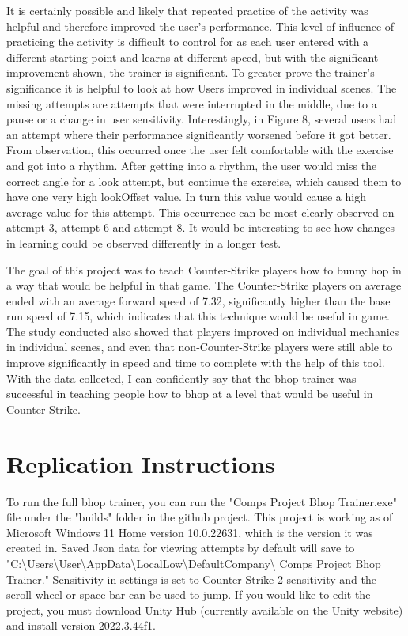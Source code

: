\documentclass[10pt,twocolumn]{article}
\begin{document}
It is certainly possible and likely that repeated practice of the activity was helpful and therefore improved the user's performance. This level of influence of practicing the activity is difficult to control for as each user entered with a different starting point and learns at different speed, but with the significant improvement shown, the trainer is significant. To greater prove the trainer's significance it is helpful to look at how Users improved in individual scenes. The missing attempts are attempts that were interrupted in the middle, due to a pause or a change in user sensitivity.  Interestingly, in Figure 8, several users had an attempt where their performance significantly worsened before it got better. From observation, this occurred once the user felt comfortable with the exercise and got into a rhythm. After getting into a rhythm, the user would miss the correct angle for a look attempt, but continue the exercise, which caused them to have one very high lookOffset value. In turn this value would cause a high average value for this attempt. This occurrence can be most clearly observed on attempt 3, attempt 6 and attempt 8. It would be interesting to see how changes in learning could be observed differently in a longer test.

The goal of this project was to teach Counter-Strike players how to bunny hop in a way that would be helpful in that game. The Counter-Strike players on average ended with an average forward speed of 7.32, significantly higher than the base run speed of 7.15, which indicates that this technique would be useful in game. The study conducted also showed that players improved on individual mechanics in individual scenes, and even that non-Counter-Strike players were still able to improve significantly in speed and time to complete with the help of this tool. With the data collected, I can confidently say that the bhop trainer was successful in teaching people how to bhop at a level that would be useful in Counter-Strike.
    

\printbibliography

\appendix
\section{Replication Instructions}
To run the full bhop trainer, you can run the "Comps Project Bhop Trainer.exe" file under the "builds" folder in the github project. This project is working as of Microsoft Windows 11 Home version 10.0.22631, which is the version it was created in. Saved Json data for viewing attempts by default will save to "C:\textbackslash{}Users\textbackslash{}User\textbackslash{}AppData\textbackslash{}LocalLow\textbackslash{}DefaultCompany\textbackslash{} Comps Project Bhop Trainer." Sensitivity in settings is set to Counter-Strike 2 sensitivity and the scroll wheel or space bar can be used to jump. If you would like to edit the project, you must download Unity Hub (currently available on the Unity website) and install version 2022.3.44f1. 
\end{document}
